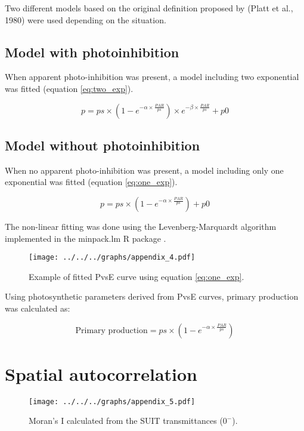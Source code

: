 \documentclass[12pt,a4paper]{scrartcl}
\begin{document}
Two different models based on the original definition proposed by (Platt et al., 1980) were used depending on the situation.

\subsection*{Model with photoinhibition}

When apparent photo-inhibition was present, a model including two exponential was fitted (equation \ref{eq:two_exp}).

\begin{equation}
	p = ps \times (1 - e^{-\alpha \times \frac{PAR}{ps}}) \times e^{-\beta \times \frac{PAR}{ps}} + p0
	\label{eq:two_exp}
\end{equation}

\subsection*{Model without photoinhibition}

When no apparent photo-inhibition was present, a model including only one exponential was fitted (equation \ref{eq:one_exp}).

\begin{equation}
	p = ps \times (1 - e^{-\alpha \times \frac{PAR}{ps}}) + p0
	\label{eq:one_exp}
\end{equation}

The non-linear fitting was done using the Levenberg-Marquardt algorithm implemented in the minpack.lm R package \citep{Elzhov2013}.

\begin{figure}[h]
	\centering
	\texttt{[image: ../../../graphs/appendix\_4.pdf]}
	\caption{Example of fitted PvsE curve using equation \ref{eq:one_exp}.}
\end{figure}

Using photosynthetic parameters derived from PvsE curves, primary production was calculated as:

\begin{equation}
	\text{Primary production} = ps \times (1 - e^{-\alpha \times \frac{PAR}{ps}})
	\label{eq:pp}
\end{equation}

\clearpage
\section*{Spatial autocorrelation}

\begin{figure}[h]
	\centering
	\texttt{[image: ../../../graphs/appendix\_5.pdf]}
	\caption{Moran's I calculated from the SUIT transmittances ($0^-$).}
\end{figure}

\clearpage
\printbibliography
\end{document}

